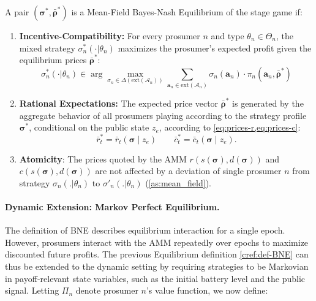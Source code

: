 \documentclass[12pt, notitlepage]{article}
\begin{document}
\begin{definition} \label{cref:def-BNE}
A pair $(\boldsymbol{\sigma}^*, \bar{\boldsymbol{\rho}}^*)$ is a Mean-Field Bayes-Nash Equilibrium of the stage game if:
\begin{enumerate}[label=(\alph*)]
    \item \textbf{Incentive-Compatibility:} For every prosumer $n$ and type $\theta_n \in \Theta_n$, the mixed strategy $\sigma_n^*(\cdot | \theta_n)$ maximizes the prosumer's expected profit given the equilibrium prices $\bar{\boldsymbol{\rho}}^*$:
    \begin{equation} \label{eqm_optimality}
        \sigma_n^*(\cdot|\theta_n) \in \arg\max_{\sigma_n \in \Delta(\text{ext}(\mathcal{A}_n))} \sum_{\mathbf{a}_n \in \text{ext}(\mathcal{A}_n)} \sigma_n(\mathbf{a}_n) \cdot \pi_n(\mathbf{a}_n, \bar{\boldsymbol{\rho}}^*)
    \end{equation}

    \item \textbf{Rational Expectations:} The expected price vector $\bar{\boldsymbol{\rho}}^*$ is generated by the aggregate behavior of all prosumers playing according to the strategy profile $\boldsymbol{\sigma}^*$, conditional on the public state $z_e$, according to \cref{eq:prices-r,eq:prices-c}:
    $$  \bar{r}_t^* =  \bar{r}_t(\boldsymbol{\sigma} \mid z_e) \qquad  \bar{c}_t^* =  \bar{c}_t(\boldsymbol{\sigma} \mid z_e). $$

    \item \textbf{Atomicity}:  The prices quoted by the AMM $r(s(\boldsymbol{\sigma}),d(\boldsymbol{\sigma}))$ and $c(s(\boldsymbol{\sigma}),d(\boldsymbol{\sigma}))$ are not affected by a deviation of single prosumer $n$ from strategy $\sigma_n(.|\theta_n)$  to $\sigma'_n(.|\theta_n)$ (\cref{as:mean_field}).
\end{enumerate}
\end{definition}

\paragraph{Dynamic Extension: Markov Perfect Equilibrium.}
The definition of BNE describes equilibrium interaction for a single epoch. However, prosumers interact with the AMM repeatedly over epochs to maximize discounted future profits. The previous Equilibrium definition \ref{cref:def-BNE} can thus be extended to the dynamic setting by requiring strategies to be  Markovian in payoff-relevant state variables, such as the initial battery level and the public signal. Letting $\Pi_n$ denote prosumer $n$'s value function, we now define:
\end{document}
